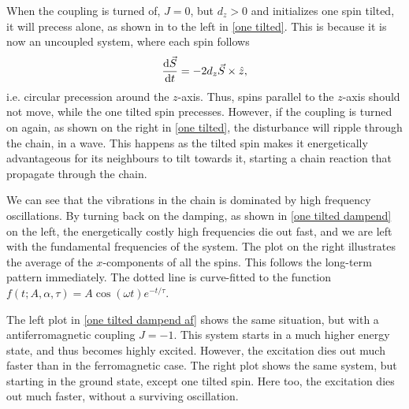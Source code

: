 \documentclass{article}
\begin{document}
    When the coupling is turned of, $J = 0$, but $d_z>0$ and initializes one spin tilted, it will precess alone, as shown in to the left in \autoref{one tilted}.
    This is because it is now an uncoupled system, where each spin follows 
    \begin{equation*}
        \dv{\vec S}{t} = - 2 d_z \vec S \times \hat z, 
    \end{equation*}
    i.e.
    circular precession around the $z$-axis.
    Thus, spins parallel to the $z$-axis should not move, while the one tilted spin precesses.
    However, if the coupling is turned on again, as shown on the right in \autoref{one tilted}, the disturbance will ripple through the chain, in a wave.
    This happens as the tilted spin makes it energetically advantageous for its neighbours to tilt towards it, starting a chain reaction that propagate through the chain.

    We can see that the vibrations in the chain is dominated by high frequency oscillations.
    By turning back on the damping, as shown in \autoref{one tilted dampend} on the left, the energetically costly high frequencies die out fast, and we are left with the fundamental frequencies of the system.
    The plot on the right illustrates the average of the $x$-components of all the spins.
    This follows the long-term pattern immediately.
    The dotted line is curve-fitted to the function $f(t; A, \alpha, \tau) = A \cos(\omega t) e^{-t/\tau}$.

    The left plot in \autoref{one tilted dampend af} shows the same situation, but with a antiferromagnetic coupling $J = -1$.
    This system starts in a much higher energy state, and thus becomes highly excited.
    However, the excitation dies out much faster than in the ferromagnetic case.
    The right plot shows the same system, but starting in the ground state, except one tilted spin.
    Here too, the excitation dies out much faster, without a surviving oscillation.
\end{document}
